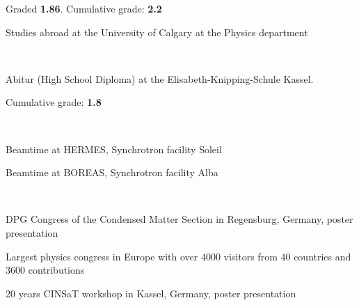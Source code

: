 \begin{minipage}[t]{0.70\textwidth}
\begin{tightemize}
Graded \textbf{1.86}. Cumulative grade: \textbf{2.2}
\end{tightemize}

\begin{tightemize}
\item Studies abroad at the University of Calgary at the Physics department
\end{tightemize}
\sectionsep

\\
\begin{tightemize}
\item Abitur (High School Diploma) at the Elisabeth-Knipping-Schule Kassel. 

Cumulative grade: \textbf{1.8}
\end{tightemize}
\sectionsep
{}\\
\begin{tightemize}
\item Beamtime at HERMES, Synchrotron facility Soleil
\end{tightemize}
\begin{tightemize}
\item Beamtime at BOREAS, Synchrotron facility Alba
\end{tightemize}

\sectionsep

 \\
\begin{tightemize}
\item DPG Congress of the Condensed Matter Section in Regensburg, Germany, poster presentation


Largest physics congress in Europe with over 4000 visitors from 40 countries and 3600 contributions
\end{tightemize}
\begin{tightemize}
\item 20 years CINSaT workshop in Kassel, Germany, poster presentation 



\end{tightemize}
\end{minipage}

